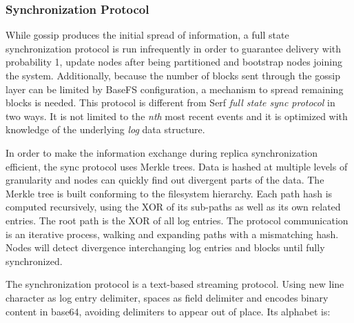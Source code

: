 \documentclass{sig-alternate}
\begin{document}
\subsubsection{Synchronization Protocol}

While gossip produces the initial spread of information, a full state synchronization protocol is run infrequently in order to guarantee delivery with probability 1, update nodes after being partitioned and bootstrap nodes joining the system. Additionally, because the number of blocks sent through the gossip layer can be limited by BaseFS configuration, a mechanism to spread remaining blocks is needed. This protocol is different from Serf \textit{full state sync protocol} in two ways. It is not limited to the \textit{nth} most recent events and it is optimized with knowledge of the underlying \textit{log} data structure.


In order to make the information exchange during replica synchronization efficient, the sync protocol uses Merkle trees. Data is hashed at multiple levels of granularity and nodes can quickly find out divergent parts of the data. The Merkle tree is built conforming to the filesystem hierarchy. Each path hash is computed recursively, using the XOR of its sub-paths as well as its own related entries. The root path is the XOR of all log entries. The protocol communication is an iterative process, walking and expanding paths with a mismatching hash. Nodes will detect divergence interchanging log entries and blocks until fully synchronized. 

The synchronization protocol is a text-based streaming protocol. Using new line character as log entry delimiter, spaces as field delimiter and encodes binary content in base64, avoiding delimiters to appear out of place. Its alphabet is:
\end{document}
